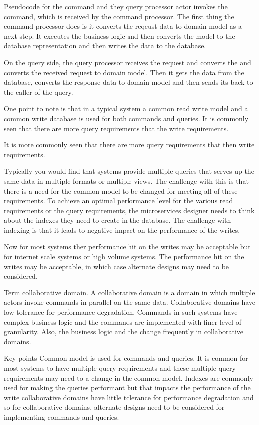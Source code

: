 Pseudocode for the command and they query processor actor invokes the command, which is received by the command processor.
The first thing the command processor does is it converts the reqeust data to domain model as a next step.
It executes the business logic and then converts the model to the database representation and then writes the data to the database.

On the query side, the query processor receives the request and converts the and converts the received request to domain model.
Then it gets the data from the database, converts the response data to domain model and then sends its back to the caller of the query.

One point to note is that in a typical system a common read write model and a common write database is used for both commands and queries.
It is commonly seen that there are more query requirements that the write requirements.

It is more commonly seen that there are more query requirements that then write requirements.

Typically you would find that systems provide multiple queries that serves up the same data in multiple formats or multiple views.
The challenge with this is that there is a need for the common model to be changed for meeting all of these requirements.
To achieve an optimal performance level for the various read requirements or the query requirements, the microservices designer needs to think about the indexes they need to create in the database.
The challenge with indexing is that it leads to negative impact on the performance of the writes.

Now for most systems ther performance hit on the writes may be acceptable but for internet scale systems or high volume systems.
The performance hit on the writes may be acceptable, in which case alternate designs may need to be considered.

Term collaborative domain.
A collaborative domain is a domain in which multiple actors invoke commands in parallel on the same data.
Collaborative domains have low tolerance for performance degradation.
Commands in such systems have complex business logic and the commands are implemented with finer level of granularity.
Also, the business logic and the change frequently in collaborative domains.

Key points
Common model is used for commands and queries.
It is common for most systems to have multiple query requirements and these multiple query requirements may need to a change in the common model.
Indexes are commonly used for making the queries performant but that impacts the performance of the write collaborative domains have little tolerance for performance degradation and so for collaborative domains, alternate designs need to be considered for implementing commands and queries.

